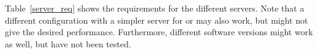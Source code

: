 Table~\ref{server_req} shows the requirements for the different servers. Note that a different configuration with a simpler server for \oapoc{} or \omfraf{} may also work, but might not give the desired performance. Furthermore, different software versions might work as well, but have not been tested.

